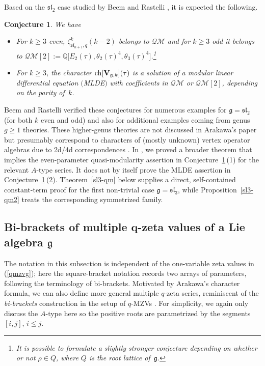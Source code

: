 \documentclass[pdftex]{sigma}
\numberwithin{equation}{section}
\newtheorem{Conjecture}[Theorem]{Conjecture}
\theoremstyle{definition}
\begin{document}
Based on the $\mathfrak{sl}_2$ case studied by Beem and Rastelli \cite{Beem}, it is expected the following.

\begin{Conjecture} \label{MLDE} We have
\begin{itemize}\itemsep=0pt
\item[$(1)$] For $k \geq 3$ even, $\zeta_{\mathfrak{sl}_{n+1},q}^k(k-2)$ belongs to $\mathcal{QM}$ and for $k \geq 3$ odd it belongs to $\mathcal{QM}[2]:=\mathbb{Q}\bigl[E_2(\tau), \theta_2(\tau)^4,\theta_3(\tau)^4\bigr]$.\footnote{It is possible to formulate a slightly stronger conjecture depending on whether or not $\rho \in Q$, where $Q$ is the root lattice of~$\mathfrak{g}$.}
\item[$(2)$]For $k \geq 3$, the character ${\rm ch}[\mathbf{V}_{\mathfrak{g},k}](\tau)$ is a solution of a modular linear differential equation $($MLDE$)$ with coefficients in $\mathcal{QM}$ or $\mathcal{QM}[2]$, depending on the parity of~$k$.
\end{itemize}
\end{Conjecture}
Beem and Rastelli verified these conjectures for numerous examples for $\mathfrak{g}=\mathfrak{sl}_2$ (for both $k$ even and odd) and also for additional examples coming from
genus $g \geq 1$ theories. These higher-genus theories are not discussed in Arakawa's paper but presumably correspond to characters of (mostly unknown) vertex operator algebras due to 2d/4d correspondences \cite{BR}. In \cite{BVM}, we proved a broader theorem that implies the even-parameter quasi-modularity assertion in Conjecture~\ref{MLDE}\,(1) for the relevant $A$-type series. It does not by itself prove the MLDE assertion in Conjecture~\ref{MLDE}\,(2). Theorem~\ref{sl3-qm} below supplies a direct, self-contained constant-term proof for the first non-trivial case $\mathfrak{g}=\mathfrak{sl}_3$, while Proposition~\ref{sl3-qm2} treats the corresponding symmetrized family.

\subsection[Bi-brackets of multiple q-zeta values of a Lie algebra g]{Bi-brackets of multiple $\boldsymbol{q}$-zeta values of a Lie algebra $\boldsymbol{\mathfrak{g}}$}\label{section3.4}

The notation in this subsection is independent of the one-variable zeta values in (\ref{qmzvg}); here the square-bracket notation records two arrays of parameters, following the terminology of bi-brackets.
Motivated by Arakawa's character formula, we can also define more general multiple $q$-zeta series, reminiscent of the {\em bi-brackets} construction in the setup of $q$-MZVs \cite{BK2,BK1,BK3}. For simplicity, we again only discuss the $A$-type here so the positive roots are parametrized by the segments $[i,j]$, $i \leq j$.
\end{document}

